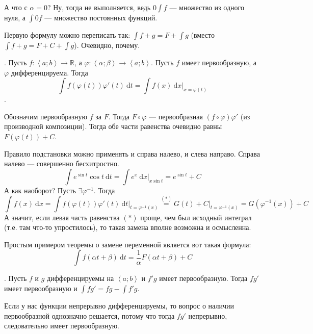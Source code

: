\documentclass{article}
\newcommand*{\ab}[1][a;b]{{\left\langle #1\right\rangle}}
\begin{document}
\begin{itemize}
\begin{Proof}
        \end{Proof}
        \begin{Comment}
            А что с $\alpha=0$? Ну, тогда не выполняется, ведь $0\int f$ --- множество из одного нуля, а $\int 0f$ --- множество постоянных функций.
        \end{Comment}
        \begin{Comment}
            Первую формулу можно переписать так: $\int f+g=F+\int g$ (вместо $\int f+g=F+C+\int g$). Очевидно, почему.
        \end{Comment}
        \thm {}. Пусть $f\colon\ab\to\mathbb R$, а $\varphi\colon\ab[\alpha;\beta]\to\ab$. Пусть $f$ имеет первообразную, а $\varphi$ дифференцируема. Тогда
        $$\int f(\varphi(t))\varphi'(t)~\mathrm dt=\int f(x)~\mathrm dx\big|_{x=\varphi(t)}$$.
        \begin{Proof}
            Обозначим первообразную $f$ за $F$. Тогда $F\circ\varphi$ --- первообразная $(f\circ\varphi)\varphi'$ (из производной композиции). Тогда обе части равенства очевидно равны $F(\varphi(t))+C$.
        \end{Proof}
        \begin{Example}
            Правило подстановки можно применять и справа налево, и слева направо. Справа налево --- совершенно бесхитростно.
            $$\int e^{\sin t}\cos t~\mathrm dt=\int e^x~\mathrm dx\big|_{x\sin t}=e^{\sin t}+C$$
            А как наоборот? Пусть $\exists\varphi^{-1}$. Тогда
            $$\int f(x)~\mathrm dx=\int f(\varphi(t))\varphi'(t)~\mathrm dt\big|_{t=\varphi^{-1}(x)}\overset{(*)}=G(t)+C\big|_{t=\varphi^{-1}(x)}=G(\varphi^{-1}(x))+C$$
            А значит, если левая часть равенства $(*)$ проще, чем был исходный интеграл (т.е. там что-то упростилось), то такая замена вполне возможна и осмысленна.
        \end{Example}
        \begin{Example}
            Простым примером теоремы о замене переменной является вот такая формула:
            $$\int f(\alpha t+\beta)~\mathrm dt=\frac1\alpha F(\alpha t+\beta)+C$$
        \end{Example}
        \thm {}. Пусть $f$ и $g$ дифференцируемы на $\ab$ и $f'g$ имеет первообразную. Тогда $fg'$ имеет первообразную и $\int fg'=fg-\int f'g$.
        \begin{Comment}
            Если у нас функции непрерывно дифференцируемы, то вопрос о наличии первообразной однозначно решается, потому что тогда $fg'$ непрерывно, следовательно имеет первообразную.

\end{Comment}
\end{itemize}
\end{document}
